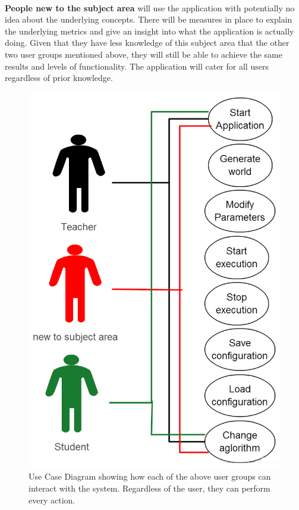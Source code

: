 \noindent \\
\textbf{People new to the subject area} will use the application with potentially no idea about the underlying concepts. There will be measures in place to explain the underlying metrics and give an insight into what the application is actually doing. Given that they have less knowledge of this subject area that the other two user groups mentioned above, they will still be able to achieve the same results and levels of functionality. The application will cater for all users regardless of prior knowledge.

\begin{figure}[H]
\centering
\includegraphics[scale=0.4]{Images/requirements/useCase}
\caption[Use Case Diagram]{Use Case Diagram showing how each of the above user groups can interact with the system. Regardless of the user, they can perform every action.}
\label{fig:useCase}
\end{figure}


